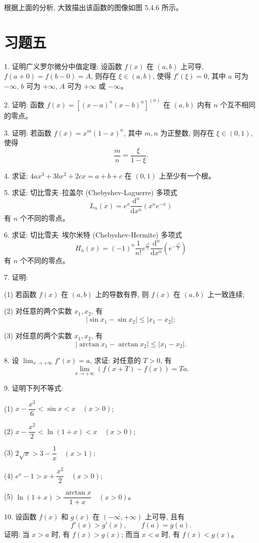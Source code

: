 \documentclass[UTF8, 12pt, fontset=fandol, oneside]{ctexart}
\begin{document}
根据上面的分析, 大致描出该函数的图像如图 5.4.6 所示。

\section*{习题五}

1. 证明广义罗尔微分中值定理: 设函数 $f(x)$ 在 $(a,b)$ 上可导, $f(a+0)=f(b-0)=A$, 则存在 $\xi\in(a,b)$, 使得 $f'(\xi)=0$, 其中 $a$ 可为 $-\infty$, $b$ 可为 $+\infty$, $A$ 可为 $+\infty$ 或 $-\infty$。

2. 证明: 函数 $f(x)=[(x-a)^n(x-b)^n]^{(n)}$ 在 $(a,b)$ 内有 $n$ 个互不相同的零点。

3. 证明: 若函数 $f(x)=x^m(1-x)^n$, 其中 $m,n$ 为正整数, 则存在 $\xi\in(0,1)$, 使得
\[
  \frac mn=\frac{\xi}{1-\xi}.
\]

4. 求证: $4ax^3+3bx^2+2cx=a+b+c$ 在 $(0,1)$ 上至少有一个根。

5. 求证: 切比雪夫--拉盖尔 (Chebyshev-Laguerre) 多项式
\[
  L_n(x)=e^x\frac{\mathrm d^n}{\mathrm dx^n}(x^ne^{-x})
\]
有 $n$ 个不同的零点。

6. 求证: 切比雪夫--埃尔米特 (Chebyshev-Hermite) 多项式
\[
  H_n(x)=(-1)^n\frac1{n!}e^{\frac{x^2}2}\frac{\mathrm d^n}{\mathrm dx^n}\left(e^{-\frac{x^2}2}\right)
\]
有 $n$ 个不同的零点。

7. 证明:

(1) 若函数 $f(x)$ 在 $(a,b)$ 上的导数有界, 则 $f(x)$ 在 $(a,b)$ 上一致连续;

(2) 对任意的两个实数 $x_1,x_2$, 有
\[
  |\sin x_1-\sin x_2|\leqslant |x_1-x_2|;
\]

(3) 对任意的两个实数 $x_1,x_2$, 有
\[
  |\arctan x_1-\arctan x_2|\leqslant |x_1-x_2|.
\]

8. 设 $\lim_{x\to+\infty}f'(x)=a$, 求证: 对任意的 $T>0$, 有
\[
  \lim_{x\to+\infty}(f(x+T)-f(x))=Ta.
\]

9. 证明下列不等式:

(1) $x-\dfrac{x^3}6<\sin x<x\quad (x>0)$;

(2) $x-\dfrac{x^2}2<\ln(1+x)<x\quad (x>0)$;

(3) $2\sqrt x>3-\dfrac1x\quad (x>1)$;

(4) $e^x-1>x+\dfrac{x^2}2\quad (x>0)$;

(5) $\ln(1+x)>\dfrac{\arctan x}{1+x}\quad (x>0)$。

10. 设函数 $f(x)$ 和 $g(x)$ 在 $(-\infty,+\infty)$ 上可导, 且有
\[
  f'(x)>g'(x),\qquad f(a)=g(a).
\]
证明: 当 $x>a$ 时, 有 $f(x)>g(x)$; 而当 $x<a$ 时, 有 $f(x)<g(x)$。
\end{document}
